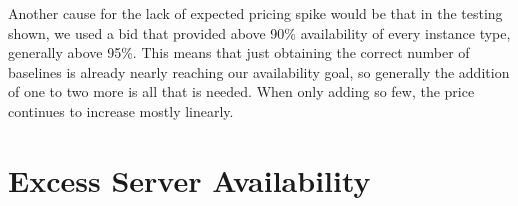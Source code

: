 \documentclass[thesis,proposal]{umassthesis}  %
\begin{document}
Another cause for the lack of expected pricing spike would be that in the testing shown, we used a bid that provided above 90\% availability of every instance type, generally above 95\%. This means that just obtaining the correct number of baselines is already nearly reaching our availability goal, so generally the addition of one to two more is all that is needed. When only adding so few, the price continues to increase mostly linearly.


\section{Excess Server Availability}

\begin{figure}
	\begin{minipage}{0.49\textwidth}
    \end{minipage}
    \begin{minipage}{0.49\textwidth}

\end{minipage}
\end{figure}
\end{document}
